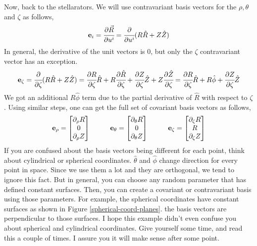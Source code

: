 Now, back to the stellarators. We will use contravariant basis vectors for the $\rho, \theta$  and $\zeta$ as follows,
\begin{equation}
    \mathbf{e}_i = \cfrac{\partial \Vec{R}}{\partial u^i} = \cfrac{\partial }{\partial u^i} (R\hat{R} + Z\hat{Z})
\end{equation}
In general, the derivative of the unit vectors is 0, but only the $\zeta$ contravariant vector has an exception.
\begin{equation}
    \mathbf{e}_\zeta = \cfrac{\partial }{\partial \zeta} (R\hat{R} + Z\hat{Z}) 
    = \cfrac{\partial R}{\partial \zeta}\hat{R} + R\cfrac{\partial \hat{R}}{\partial \zeta} + \cfrac{\partial Z}{\partial \zeta}\hat{Z} + Z\cfrac{\partial \hat{Z}}{\partial \zeta}
    = \cfrac{\partial R}{\partial \zeta}\hat{R} + R\hat{\phi} + \cfrac{\partial Z}{\partial \zeta}\hat{Z}
\end{equation}
We got an additional $R\hat{\phi}$ term due to the partial derivative of $\hat{R}$ with respect to $\zeta$. Using similar steps, one can get the full set of covariant basis vectors as follows,
\begin{equation}
    \mathbf{e}_\rho =  \begin{bmatrix}
        \partial_\rho R \\ 0 \\ \partial_\rho Z
    \end{bmatrix} \hspace{1cm}
    \mathbf{e}_\theta =  \begin{bmatrix}
        \partial_\theta R \\ 0 \\ \partial_\theta Z
    \end{bmatrix}\hspace{1cm}
    \mathbf{e}_\zeta =  \begin{bmatrix}
        \partial_\zeta R \\ R \\ \partial_\zeta Z
    \end{bmatrix}
\end{equation}
If you are confused about the basis vectors being different for each point, think about cylindrical or spherical coordinates. $\hat{\theta}$ and $\hat{\phi}$ change direction for every point in space. Since we use them a lot and they are orthogonal, we tend to ignore this fact. But in general, you can choose any random parameter that has defined constant surfaces. Then, you can create a covariant or contravariant basis using those parameters. For example, the spherical coordinates have constant surfaces as shown in Figure \ref{spherical-coord-planes}. the basis vectors are perpendicular to those surfaces. I hope this example didn't even confuse you about spherical and cylindrical coordinates. Give yourself some time, and read this a couple of times. I assure you it will make sense after some point.
